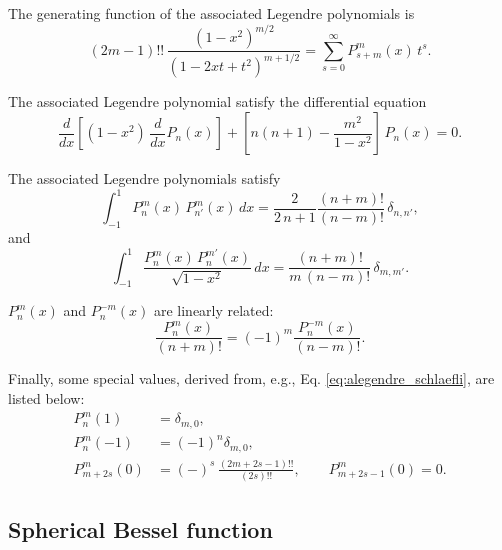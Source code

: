\documentclass[11pt]{article}
\begin{document}
The generating function of the associated Legendre polynomials is
%
\begin{equation}
  (2 m - 1)!! \,
  \frac{ (1 - x^2)^{m/2} }
  { (1 - 2 x t + t^2)^{m + 1/2} }
=
  \sum_{s = 0}^\infty P_{s+m}^m(x) \, t^s.
  \label{eq:alegendre_gf}
\end{equation}

The associated Legendre polynomial satisfy the differential equation
\begin{equation}
  \frac{d}{dx}
  \left[
    (1 - x^2) \, \frac{d}{dx} P_n(x)
  \right]
+
  \left[
    n (n + 1) - \frac{m^2}{1 - x^2}
  \right]
  \, P_n(x) = 0.
\label{eq:alegendre_diffeq}
\end{equation}

The associated Legendre polynomials satisfy
\begin{equation}
  \int_{-1}^1
  P_n^m(x) \, P_{n'}^m(x) \, dx
=
  \frac { 2 } { 2 \, n + 1 }
  \frac{ (n + m)! } { (n - m)! }
  \,
  \delta_{n, n'},
  \label{eq:alegendre_orthonormal}
\end{equation}
%
and
%
\begin{equation}
  \int_{-1}^1
  \frac{
    P_n^m(x) \, P_n^{m'}(x)
  } {
    \sqrt{ 1 - x^2 }
  }\, dx
=
  \frac{ (n + m)! } { m \, (n - m)! }
  \,
  \delta_{m, m'}.
  \label{eq:alegendre_orthonormal2}
\end{equation}

$P_n^m(x)$ and $P_n^{-m}(x)$ are linearly related:
\begin{equation}
  \frac{ P_n^m(x) } { (n + m)! }
=
  (-1)^m
  \frac{ P_n^{-m}(x) } { (n - m)! }.
  \label{eq:PnmPnnegm}
\end{equation}

Finally, some special values, derived from, e.g., Eq. \eqref{eq:alegendre_schlaefli}, are listed below:
\begin{align}
  P_n^m(1)    &= \delta_{m, 0},
  \label{eq:alegendre_1} \\
  P_n^m(-1)   &= (-1)^n \delta_{m, 0},
  \label{eq:alegendre_neg1} \\
  P_{m+2s}^m(0) &= (-)^s \, \frac{ (2m + 2s - 1)!! }{ (2s)!! },
  \qquad
  P_{m+2s-1}^m(0) = 0.
  \label{eq:alegendre_0}
\end{align}



\subsection{Spherical Bessel function}
\end{document}
